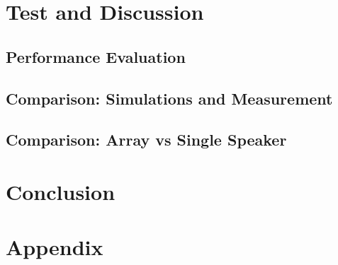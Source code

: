
\part{Test and Discussion}\label{pt:test}
\graphicspath{{figures/tests/}}
	\chapter{Performance Evaluation}
	\chapter{Comparison: Simulations and Measurement}
	\chapter{Comparison: Array vs Single Speaker}


 
\part{Conclusion}\label{pt:conclusion}
% 
%

\glsresetall
\appendix %

 \graphicspath{{figures/appendix/}}
\part{Appendix}\label{pt:appendix}














